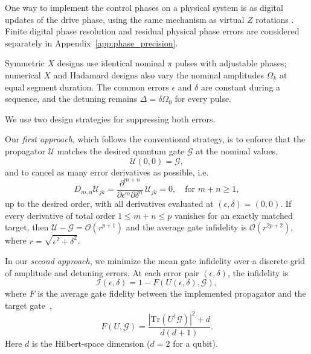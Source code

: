 \documentclass[10pt,aps,twocolumn,pra,floatfix,superscriptaddress]{revtex4-2}
\def\be{ \begin{equation} }
\def\ee{ \end{equation} }
\begin{document}
One way to implement the control phases on a physical system is as digital updates of the drive phase, using the same mechanism as virtual $Z$ rotations \cite{McKay_2017}. Finite digital phase resolution and residual physical phase errors are considered separately in Appendix~\ref{app:phase_precision}.

Symmetric $X$ designs use identical nominal $\pi$ pulses with adjustable phases; numerical $X$ and Hadamard designs also vary the nominal amplitudes $\Omega_k$ at equal segment duration. The common errors $\epsilon$ and $\delta$ are constant during a sequence, and the detuning remains $\Delta=\delta\Omega_0$ for every pulse.

We use two design strategies for suppressing both errors.

Our \textit{first approach}, which follows the conventional strategy, is to enforce that the propagator $\mathcal{U}$ matches the desired quantum gate $\mathcal{G}$ at the nominal values,
\be
\mathcal{U}(0,0) = \mathcal{G},
\ee
and to cancel as many error derivatives as possible, i.e.
\be
D_{m,n}\mathcal{U}_{jk} = \frac{\partial^{m+n}}{\partial \epsilon^m \partial \delta^n} \, \mathcal{U}_{jk} = 0,
\quad \text{for } m+n \geq 1,
\label{eq:derivatives}
\ee
up to the desired order, with all derivatives evaluated at $(\epsilon,\delta)=(0,0)$.
If every derivative of total order $1\leq m+n\leq p$ vanishes for an exactly matched target, then $\mathcal U-\mathcal G=\mathcal O(r^{p+1})$ and the average gate infidelity is $\mathcal O(r^{2p+2})$, where $r=\sqrt{\epsilon^2+\delta^2}$.

In our \textit{second approach}, we minimize the mean gate infidelity over a discrete grid of amplitude and detuning errors. At each error pair $(\epsilon,\delta)$, the infidelity is
\begin{equation}
\mathcal I(\epsilon,\delta)
=1-F\!\left(U(\epsilon,\delta),\mathcal G\right),
\label{eq:infidelity}
\end{equation}
where $F$ is the average gate fidelity between the implemented propagator and the target gate~\cite{Nielsen_2002,Pedersen_2007},
\begin{equation}
F(U,\mathcal G)
=\frac{|\mathrm{Tr}(U^\dagger\mathcal G)|^2+d}{d(d+1)}.
\label{eq:fidelity_function}
\end{equation}
Here $d$ is the Hilbert-space dimension ($d=2$ for a qubit).
\end{document}
